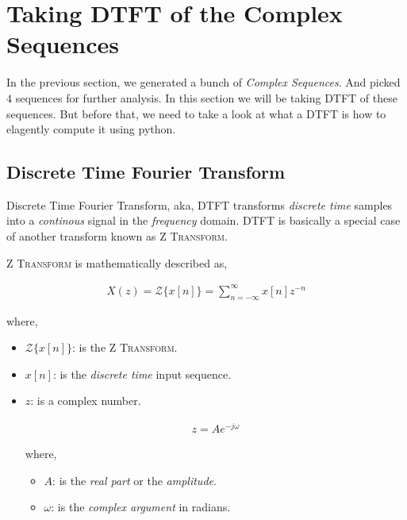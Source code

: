 \documentclass[../../course]{subfiles}
\begin{document}
\def\freqXOne{28}
\def\freqXTwo{28.1}
\def\freqXThree{56}

\section{Taking DTFT of the Complex Sequences} \label{sec:wrkTakingDTFTCplxSeqs}

In the previous section, we generated a bunch of \emph{Complex Sequences}. And
picked $4$ sequences for further analysis. In this section we will be taking
\textsc{DTFT} of these sequences. But before that, we need to take a look at what
a \textsc{DTFT} is how to elagently compute it using python.

\subsection{Discrete Time Fourier Transform}

Discrete Time Fourier Transform, aka, \textsc{DTFT} transforms \emph{discrete time}
samples into a \emph{continous} signal in the \emph{frequency} domain. \textsc{DTFT}
is basically a special case of another transform known as \textsc{Z Transform}.


\textsc{Z Transform} is mathematically described as,

\begin{align}
    X(z) = {\mathcal{Z}}\{x[n]\} = \sum_{n = - \infty}^{\infty} x[n] z^{-n}
\end{align}

where,

\begin{itemize} [label=]

    \item ${\mathcal{Z}}\{x[n]\}$: is the \textsc{Z Transform}.
    \item $x[n]$: is the \emph{discrete time} input sequence.
    \item $z$: is a complex number.

        \begin{align}
            z = A e^{-j \omega}
        \end{align}

        where,

        \begin{itemize} [label=]
            \item $A$: is the \emph{real part} or the \emph{amplitude}.
            \item $\omega$: is the \emph{complex argument} in radians.
        \end{itemize}

\end{itemize}
\end{document}
